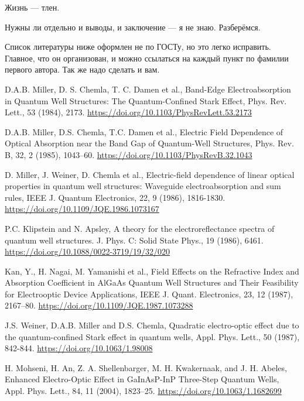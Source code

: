 \documentclass[a4paper,14pt]{extarticle}
\begin{document}
\pagebreak
{}
Жизнь --- тлен.

Нужны ли отдельно и выводы, и заключение --- я не знаю. Разберёмся.

Список литературы ниже оформлен не по ГОСТу, но это легко исправить. Главное, что он организован, и можно ссылаться на каждый пункт по фамилии первого автора. Так же надо сделать и вам.

\begin{thebibliography}{99}

     D.A.B. Miller, D. S. Chemla, T. C. Damen et al., Band-Edge Electroabsorption in Quantum Well Structures: The Quantum-Confined Stark Effect, Phys. Rev. Lett., 53 (1984), 2173. \url{https://doi.org/10.1103/PhysRevLett.53.2173}

     D.A.B. Miller, D.S. Chemla, T.C. Damen et al., Electric Field Dependence of Optical Absorption near the Band Gap of Quantum-Well Structures, Phys. Rev. B, 32, 2 (1985), 1043–60. \url{https://doi.org/10.1103/PhysRevB.32.1043}
    
     D. Miller, J. Weiner, D. Chemla et al., Electric-field dependence of linear optical properties in quantum well structures: Waveguide electroabsorption and sum rules, IEEE J. Quantum Electronics, 22, 9 (1986), 1816-1830. \url{https://doi.org/10.1109/JQE.1986.1073167}
    
     P.C. Klipstein and N. Apsley, A theory for the electroreflectance spectra of quantum well structures. J. Phys. C: Solid State Phys., 19 (1986), 6461. \url{https://doi.org/10.1088/0022-3719/19/32/020}
    
     Kan, Y., H. Nagai, M. Yamanishi et al., Field Effects on the Refractive Index and Absorption Coefficient in AlGaAs Quantum Well Structures and Their Feasibility for Electrooptic Device Applications, IEEE J. Quant. Electronics, 23, 12 (1987), 2167–80. \url{https://doi.org/10.1109/JQE.1987.1073288}
    
     J.S. Weiner, D.A.B. Miller and D.S. Chemla, Quadratic electro-optic effect due to the quantum-confined Stark effect in quantum wells, Appl. Phys. Lett., 50 (1987), 842-844. \url{https://doi.org/10.1063/1.98008}
    
     H. Mohseni, H. An, Z. A. Shellenbarger, M. H. Kwakernaak, and J. H. Abeles, Enhanced Electro-Optic Effect in GaInAsP-InP Three-Step Quantum Wells, Appl. Phys. Lett., 84, 11 (2004), 1823–25. \url{https://doi.org/10.1063/1.1682699}
    

\end{thebibliography}
\end{document}

